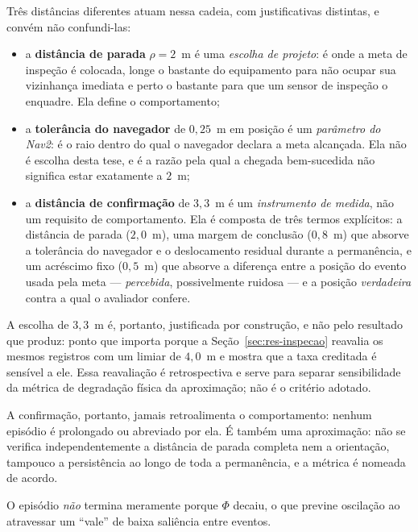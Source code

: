 Três distâncias diferentes atuam nessa cadeia, com justificativas distintas, e
convém não confundi-las:

\begin{itemize}
    \item a \textbf{distância de parada} $\rho=2$~m é uma \emph{escolha de projeto}:
    é onde a meta de inspeção é colocada, longe o bastante do equipamento para não
    ocupar sua vizinhança imediata e perto o bastante para que um sensor de inspeção
    o enquadre. Ela define o comportamento;
    \item a \textbf{tolerância do navegador} de $0{,}25$~m em posição é um
    \emph{parâmetro do Nav2}: é o raio dentro do qual o navegador declara a meta
    alcançada. Ela não é escolha desta tese, e é a razão pela qual a chegada
    bem-sucedida não significa estar exatamente a $2$~m;
    \item a \textbf{distância de confirmação} de $3{,}3$~m é um \emph{instrumento de
    medida}, não um requisito de comportamento. Ela é composta de três termos
    explícitos: a distância de parada ($2{,}0$~m), uma margem de conclusão
    ($0{,}8$~m) que absorve a tolerância do navegador e o deslocamento residual
    durante a permanência, e um acréscimo fixo ($0{,}5$~m) que absorve a diferença
    entre a posição do evento usada pela meta --- \emph{percebida}, possivelmente
    ruidosa --- e a posição \emph{verdadeira} contra a qual o avaliador confere.
\end{itemize}

A escolha de $3{,}3$~m é, portanto, justificada por construção, e não pelo resultado
que produz: ponto que importa porque a Seção~\ref{sec:res-inspecao} reavalia os
mesmos registros com um limiar de $4{,}0$~m e mostra que a taxa creditada é sensível a
ele. Essa reavaliação é retrospectiva e serve para separar sensibilidade da métrica de
degradação física da aproximação; não é o critério adotado.

A confirmação, portanto, jamais retroalimenta o comportamento: nenhum episódio é
prolongado ou abreviado por ela. É também uma aproximação: não se verifica
independentemente a distância de parada completa nem a orientação, tampouco a
persistência ao longo de toda a permanência, e a métrica é nomeada de acordo.

O episódio \emph{não} termina meramente porque $\Phi$ decaiu, o que previne oscilação
ao atravessar um ``vale'' de baixa saliência entre eventos.

